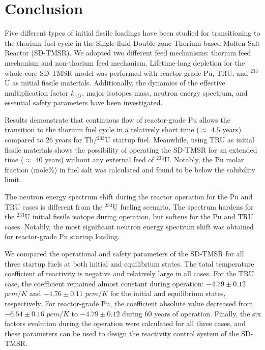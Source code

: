 \section{Conclusion} \label{Conclusion}

Five different types of initial fissile loadings have been studied for 
transitioning to the thorium fuel cycle in the Single-fluid Double-zone Thorium-based Molten Salt Reactor (SD-TMSR). We 
adopted two different feed mechanisms: thorium feed mechanism and non-thorium 
feed mechanism. Lifetime-long depletion for the whole-core SD-TMSR model was 
performed with reactor-grade Pu, TRU, and $^{233}$U as initial fissile 
materials. Additionally, the dynamics of the effective multiplication factor 
$k_{eff}$, major isotopes mass, neutron energy spectrum, and essential safety 
parameters have been investigated. 

Results demonstrate that continuous flow of reactor-grade Pu allows the 
transition to the thorium fuel cycle in a relatively short time ($\approx$ 
$4.5$ years) compared to $26$ years for Th/$^{233}$U startup fuel. 
Meanwhile, using \gls{TRU} as initial fissile materials shows the possibility 
of operating the SD-TMSR for an extended time ($\approx$ $40$ years) 
without any external feed of $^{233}$U. Notably, the Pu molar fraction (mole\%) in 
fuel salt was calculated and found to be below the solubility limit. 

The neutron energy spectrum shift during the reactor operation 
for the Pu and TRU cases is different from the $^{233}$U fueling scenario. 
The spectrum hardens for the $^{233}$U initial fissile isotope during 
operation, but softens for the Pu and TRU cases. Notably, the most 
significant neutron energy spectrum shift was obtained for reactor-grade Pu 
startup loading. 

We compared the operational and safety parameters of the \gls{SD-TMSR} for all 
three startup fuels at both initial and equilibrium states. The total 
temperature coefficient of reactivity is negative and relatively large in all 
cases. For the TRU case, the coefficient remained almost constant during 
operation: $-4.79\pm0.12$ $pcm/K$ and $-4.76\pm0.11$ $pcm/K$ for the initial 
and equilibrium states, respectively. For reactor-grade Pu, the coefficient 
absolute value decreased from $-6.54\pm0.16$ $pcm/K$ to $-4.79\pm0.12$ during 
60 years of operation. Finally, the six factors evolution during the operation 
were calculated for all three cases, and these parameters can be used to 
design the reactivity control system of the \gls{SD-TMSR}.

